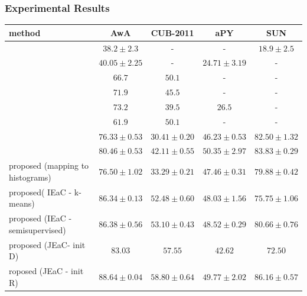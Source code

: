 \documentclass{beamer}
\begin{document}
\begin{frame}\frametitle{Experimental Results}
  \begin{center}
  {\scriptsize
  \begin{tabular}{|l|c|c|c|c|}
  \hline
  method  & AwA & CUB-2011 & aPY & SUN \\
  \hline

    {\tiny \cite{li15max}}                 &  $38.2 \pm 2.3$   &    -             &  -                       & $18.9 \pm 2.5$ \\
   {\tiny \cite{semi15}}                    &  $40.05\pm 2.25$ &       -          &   $24.71 \pm 3.19$       & -    \\
  \hline
   {\tiny \cite{Akata2015}}              & $66.7$          & $50.1$            &         -                & -\\
   {\tiny \cite{Xian2016}}                & $71.9$            & $45.5$            &        -                 & -\\
  \hline
  {\tiny \cite{Kodirov2015}}
                                              & $73.2$            &  $39.5$           & $26.5$                    &  -\\
   {\tiny \cite{Akata2015}}              & $61.9$            &  $50.1$           &                 -        & -\\
    {\tiny \cite{sse}}            &  $76.33 \pm 0.53$ & $30.41 \pm 0.20$ &   $46.23 \pm 0.53$      & $82.50 \pm 1.32$    \\
   {\tiny \cite{agnostic} }      &  $80.46 \pm 0.53$ & $42.11 \pm 0.55$ &   \textbf{$\mathbf{50.35 \pm 2.97}$}      & \underline{$83.83 \pm 0.29$}    \\
    {\tiny proposed (mapping to histograms)}
                          & $76.50 \pm 1.02$               & $33.29 \pm 0.21$              & $47.46 \pm 0.31$              & $79.88 \pm 0.42$ \\
   {\tiny proposed( IEaC -  {k-means})}
                            & $86.34 \pm 0.13$               & $52.48 \pm 0.60$              & $48.03 \pm 1.56$              & $75.75 \pm 1.06$ \\
   {\tiny proposed (IEaC - semisupervised)}
                          & \underline{$86.38 \pm 0.56$}              & \underline{$ 53.10\pm 0.43 $}             & $48.52 \pm 0.29$              &$ 80.66 \pm 0.76$ \\
   {\tiny proposed (JEaC- init D)}
                       & $83.03$                        & $57.55$                       & $42.62$          & $72.50$\\
   {\tiny roposed (JEaC - init R)}
                       & \textbf{\em $\mathbf{88.64 \pm 0.04}$}  & \textbf{\em $\mathbf{58.80 \pm 0.64}$} &
                       \underline{$49.77 \pm 2.02$} & \textbf{\em $\mathbf{86.16 \pm 0.57}$} \\
  \hline
  \end{tabular}
  }
\end{center}

\end{frame}
\end{document}
